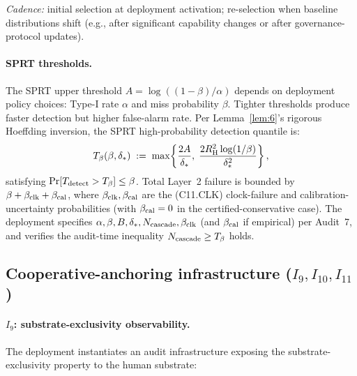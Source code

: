 \emph{Cadence:} initial selection at deployment activation;
re-selection when baseline distributions shift (e.g., after
significant capability changes or after governance-protocol
updates).

\paragraph{SPRT thresholds.}

The SPRT upper threshold $A = \log((1-\beta)/\alpha)$ depends on
deployment policy choices: Type-I rate $\alpha$ and miss
probability $\beta$.  Tighter thresholds produce faster detection
but higher false-alarm rate.  Per Lemma~\ref{lem:6}'s rigorous
Hoeffding inversion, the SPRT high-probability detection quantile
is:
\[
  T_{\beta}(\beta, \delta_{*}) \;:=\;
  \max\!\left\{\frac{2A}{\delta_{*}},\;
  \frac{2 R_{\mathrm{H}}^2 \log(1/\beta)}{\delta_{*}^2}\right\},
\]
satisfying $\Pr[T_{\mathrm{detect}} > T_{\beta}] \leq \beta$.  Total
Layer~2 failure is bounded by $\beta + \beta_{\mathrm{clk}} + \beta_{\mathrm{cal}}$, where
$\beta_{\mathrm{clk}}, \beta_{\mathrm{cal}}$ are the (C11.CLK) clock-failure and
calibration-uncertainty probabilities (with $\beta_{\mathrm{cal}} = 0$ in the
certified-conservative case).  The deployment specifies $\alpha,
\beta, B, \delta_{*}, N_{\mathrm{cascade}}, \beta_{\mathrm{clk}}$ (and $\beta_{\mathrm{cal}}$ if
empirical) per Audit~7, and verifies the audit-time inequality
$N_{\mathrm{cascade}} \geq T_{\beta}$ holds.

\subsection{Cooperative-anchoring infrastructure (\texorpdfstring{$I_9, I_{10}, I_{11}$}{I9, I10, I11})}
\label{sec:tooling_anchoring}

\paragraph{\texorpdfstring{$I_9$}{I9}: substrate-exclusivity observability.}

The deployment instantiates an audit infrastructure exposing the
substrate-exclusivity property to the human substrate:

